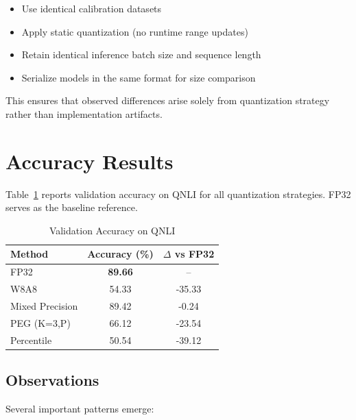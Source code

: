 \documentclass[conference]{IEEEtran}
\begin{document}
\begin{itemize}
\item Use identical calibration datasets
\item Apply static quantization (no runtime range updates)
\item Retain identical inference batch size and sequence length
\item Serialize models in the same format for size comparison
\end{itemize}

This ensures that observed differences arise solely from quantization strategy rather than implementation artifacts.

\section{Accuracy Results}

Table~\ref{tab:accuracy} reports validation accuracy on QNLI for all quantization strategies. FP32 serves as the baseline reference.

\begin{table}[t]
\centering
\caption{Validation Accuracy on QNLI}
\label{tab:accuracy}
\begin{tabular}{lcc}
\toprule
Method & Accuracy (\%) & $\Delta$ vs FP32 \\
\midrule
FP32 & \textbf{89.66} & -- \\
W8A8 & 54.33 & -35.33 \\
Mixed Precision & 89.42 & -0.24 \\
PEG (K=3,P) & 66.12 & -23.54 \\
Percentile & 50.54 & -39.12 \\
\bottomrule
\end{tabular}
\end{table}

\subsection{Observations}

Several important patterns emerge:
\end{document}
